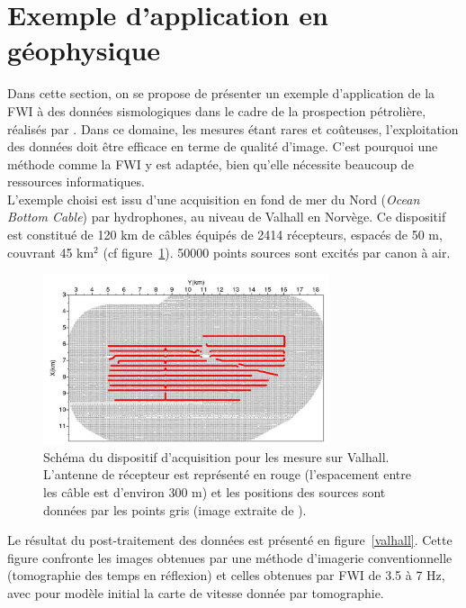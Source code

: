 \section{Exemple d'application en géophysique}

Dans cette section, on se propose de présenter un exemple d'application de la FWI à des données sismologiques dans le cadre de la prospection pétrolière, réalisés par \cite{sirgue_valhall}. Dans ce domaine, les mesures étant rares et coûteuses, l'exploitation des données doit être efficace en terme de qualité d'image. C'est pourquoi une méthode comme la FWI y est adaptée, bien qu'elle nécessite beaucoup de ressources informatiques.\\

L'exemple choisi est issu d'une acquisition en fond de mer du Nord (\emph{Ocean Bottom Cable}) par hydrophones, au niveau de Valhall en Norvège. Ce dispositif est constitué de 120 km de câbles équipés de 2414 récepteurs, espacés de 50 m, couvrant 45 km$^{2}$ (cf figure~\ref{dispositif_valhall}). 50000 points sources sont excités par canon à air.

\begin{figure}[!h]
	\centering
	\includegraphics[height=5cm]{img/dispo_valhall.jpg}
	\caption{Schéma du dispositif d'acquisition pour les mesure sur Valhall. L'antenne de récepteur est représenté en rouge (l'espacement entre les câble est d'environ 300 m) et les positions des sources sont données par les points gris (image extraite de \cite{sirgue_valhall}).\label{dispositif_valhall} }
\end{figure}

Le résultat du post-traitement des données est présenté en figure~\ref{valhall}. Cette figure confronte les images obtenues par une méthode d'imagerie conventionnelle (tomographie des temps en réflexion) et celles obtenues par FWI de 3.5 à 7 Hz, avec pour modèle initial la carte de vitesse donnée par tomographie.

